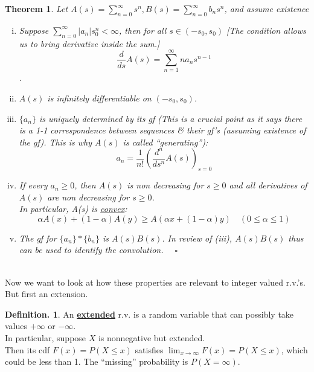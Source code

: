 \documentclass[12pt]{article}
\theoremstyle{definition}
\newtheorem{mydef}{Definition.}[section]
\theoremstyle{plain}
\newtheorem{mythm}{Theorem}[section]
\begin{document}
\begin{mythm}
Let $A(s) = \sum_{n=0}^\infty s^n, B(s) = \sum_{n=0}^\infty b_n s^n$, and assume existence
\begin{enumerate}[(i)]
\item Suppose $\sum_{n=0}^\infty |a_n| s_0^n < \infty$, then for all $s \in (-s_0, s_0)$ [The condition allows us to bring derivative inside the sum.] \[\frac{d}{ds}A(s) = \sum_{n=1}^\infty n a_n s^{n-1}\].
\item $A(s)$ is infinitely differentiable on $(-s_0, s_0)$.
\item $\{a_n\}$ is uniquely determined by its gf (This is a crucial point as it says there is a 1-1 correspondence between sequences \& their gf's (assuming existence of the gf). This is why $A(s)$ is called ``generating''): \[a_n = \frac{1}{n!} (\frac{d^n}{ds^n}A(s))_{s=0}\]
\item If every $a_n \geq 0$, then $A(s)$ is non decreasing for $s \geq 0$ and all derivatives of $A(s)$ are non decreasing for $s \geq 0$.\\
In particular, A(s) is \underline{convex}: \[\alpha A(x) + (1-\alpha) A(y) \geq A(\alpha x + (1-\alpha)y) \quad (0 \leq \alpha \leq 1)\]
\item The gf for $\{a_n\}*\{b_n\}$ is $A(s)B(s)$. In review of (iii), $A(s)B(s)$ thus can be used to identify the convolution.  $\quad \square$ 
\end{enumerate}
\end{mythm}
$\mbox{}$\\
Now we want to look at how these properties are relevant to integer valued r.v.'s.\\
But first an extension.
\begin{mydef}
An \underline{\textbf{extended}} r.v. is a random variable that can possibly take values $+\infty$ or $-\infty$. \\
In particular, suppose $X$ is nonnegative but extended. \\
Then its cdf $F(x)=P(X \leq x)$ satisfies $\lim_{x \rightarrow \infty} F(x) = P(X \leq x)$, which could be less than 1. The ``missing'' probability is $P(X = \infty)$.
\end{mydef}




\clearpage
\end{document}

